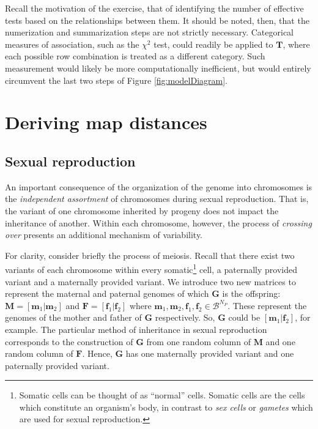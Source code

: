 \documentclass{article}
\newcommand{\ve}[1]{\mathbf{#1}}           %
\newcommand{\m}[1]{\mathbf{#1}}               %
\begin{document}
Recall the motivation of the exercise, that of identifying the number of effective tests based on the relationships between them. It should be noted, then, that the numerization and summarization steps are not strictly necessary. Categorical measures of association, such as the $\chi^2$ test, could readily be applied to $\m{T}$, where each possible row combination is treated as a different category. Such measurement would likely be more computationally inefficient, but would entirely circumvent the last two steps of Figure \ref{fig:modelDiagram}. 

\section{Deriving map distances} \label{sec:derivingDists}

\subsection{Sexual reproduction} \label{subsec:crossingover}

An important consequence of the organization of the genome into chromosomes is the \textit{independent assortment} of chromosomes during sexual reproduction. That is, the variant of one chromosome inherited by progeny does not impact the inheritance of another. Within each chromosome, however, the process of \textit{crossing over} presents an additional mechanism of variability.

For clarity, consider briefly the process of meiosis. Recall that there exist two variants of each chromosome within every somatic\footnote{Somatic cells can be thought of as ``normal'' cells. Somatic cells are the cells which constitute an organism's body, in contrast to \textit{sex cells} or \textit{gametes} which are used for sexual reproduction.} cell, a paternally provided variant and a maternally provided variant. We introduce two new matrices to represent the maternal and paternal genomes of which $\m{G}$ is the offspring: $\m{M} = [\ve{m}_1| \ve{m}_2]$ and $\m{F} = [\ve{f}_1| \ve{f}_2]$ where $\ve{m}_1, \ve{m}_2, \ve{f}_1, \ve{f}_2 \in \mathcal{B}^{N_P}$. These represent the genomes of the mother and father of $\m{G}$ respectively. So, $\m{G}$ could be $[\ve{m}_1 | \ve{f}_2]$, for example. The particular method of inheritance in sexual reproduction corresponds to the construction of $\m{G}$ from one random column of $\m{M}$ and one random column of $\m{F}$. Hence, $\m{G}$ has one maternally provided variant and one paternally provided variant.
\end{document}
